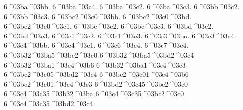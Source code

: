 {6^^^^03ba^^^^03bb.   %
6^^^^03ba^^^^03c4.   %
6^^^^03ba^^^^03c2.   %
6^^^^03ba^^^^03c3.
6^^^^03bb^^^^03c2.   %
6^^^^03bb^^^^03c3.
6^^^^03bc2^^^^03c0^^^^03bb. %
6^^^^03bc2^^^^03c0^^^^03bd. %
6^^^^03bc2^^^^03c0^^^^03c1. %
6^^^^03bc^^^^03c2.   %
6^^^^03bc^^^^03c3.
6^^^^03bd^^^^03c2.   %
6^^^^03bd^^^^03c3.
6^^^^03c1^^^^03c2.   %
6^^^^03c1^^^^03c3.
6^^^^03c3^^^^03ba.   %
6^^^^03c3^^^^03c4.   %
6^^^^03c4^^^^03bb.   %
6^^^^03c4^^^^03c1.   %
6^^^^03c6^^^^03c4.   %
6^^^^03c7^^^^03c4.   %
6^^^^03b32^^^^03ba5^^^^03bc2^^^^03c0
6^^^^03b32^^^^03ba5^^^^03bd2^^^^03c4
6^^^^03b32^^^^03ba1^^^^03c4^^^^03b6
6^^^^03b32^^^^03ba1^^^^03c4^^^^03c3
6^^^^03bc2^^^^03c05^^^^03bd2^^^^03c4
6^^^^03bc2^^^^03c01^^^^03c4^^^^03b6
6^^^^03bc2^^^^03c01^^^^03c4^^^^03c3
6^^^^03bd2^^^^03c45^^^^03bc2^^^^03c0
6^^^^03c4^^^^03c35^^^^03b32^^^^03ba
6^^^^03c4^^^^03c35^^^^03bc2^^^^03c0
6^^^^03c4^^^^03c35^^^^03bd2^^^^03c4
} %
